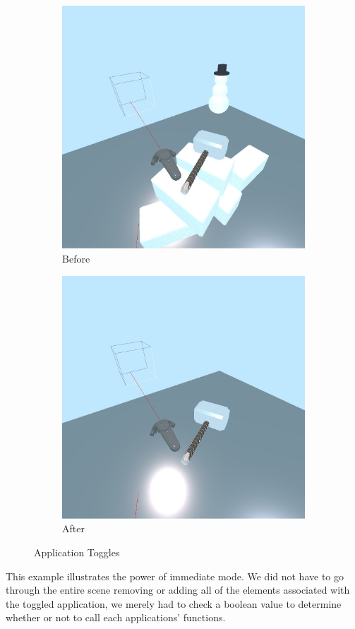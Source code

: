 \documentclass[conference,12pt]{IEEEtran}
\begin{document}
\begin{figure}[H]
    \begin{subfigure}{\linewidth}
        \centering
        \includegraphics[width=0.75\linewidth]{screenshots/toggle_a.jpg}
        \caption{Before}
    \end{subfigure}
    \begin{subfigure}{\linewidth}
        \centering
        \includegraphics[width=0.75\linewidth]{screenshots/toggle_b.jpg}
        \caption{After}
    \end{subfigure}
    \caption{Application Toggles}\label{fig:toggles}
\end{figure}

This example illustrates the power of immediate mode. We did not have to go
through the entire scene removing or adding all of the elements associated with
the toggled application, we merely had to check a boolean value to determine
whether or not to call each applications' functions.
\end{document}

